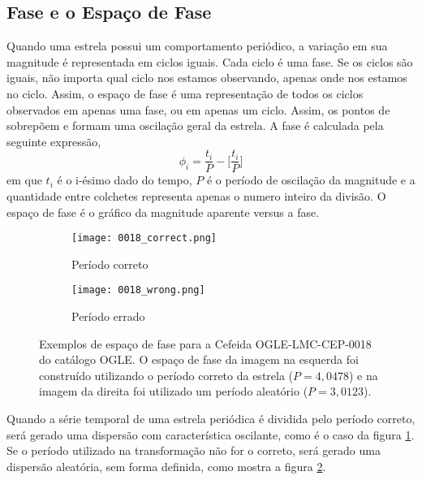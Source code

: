 \subsection{Fase e o Espaço de Fase}

Quando uma estrela possui um comportamento periódico, a variação em sua magnitude é representada em ciclos iguais. Cada ciclo é uma fase. Se os ciclos são iguais, não importa qual ciclo nos estamos observando, apenas onde nos estamos no ciclo. Assim, o espaço de fase é uma representação de todos os ciclos observados em apenas uma fase, ou em apenas um ciclo. Assim, os pontos de sobrepõem e formam uma oscilação geral da estrela. A fase é calculada pela seguinte expressão,
\begin{equation}
\phi_i = \frac{t_i}{P} - \Big[\frac{t_i}{P}\Big]
\end{equation}
em que $t_i$ é o i-ésimo dado do tempo, $P$ é o período de oscilação da magnitude e a quantidade entre colchetes representa apenas o numero inteiro da divisão. O espaço de fase é o gráfico da magnitude aparente versus a fase.


\begin{figure}[h!]
\centering
\begin{subfigure}{.5\textwidth}
  \centering
  \texttt{[image: 0018\_correct.png]}
  \caption{Período correto}
  \label{fig:right}
\end{subfigure}%
\begin{subfigure}{.5\textwidth}
  \centering
  \texttt{[image: 0018\_wrong.png]}
  \caption{Período errado}
  \label{fig:wrong}
\end{subfigure}
\caption[Exemplos de espaço de fase]{Exemplos de espaço de fase para a Cefeida OGLE-LMC-CEP-0018 do catálogo OGLE. O espaço de fase da imagem na esquerda foi construído utilizando o período correto da estrela ($P=4,0478$) e na imagem da direita foi utilizado um período aleatório ($P=3,0123$).}
\label{fig:exemplo_fase}
\end{figure}

Quando a série temporal de uma estrela periódica é dividida pelo período correto, será gerado uma dispersão com característica oscilante, como é o caso da figura \ref{fig:right}. Se o período utilizado na transformação não for o correto, será gerado uma dispersão aleatória, sem forma definida, como mostra a figura \ref{fig:wrong}. 


